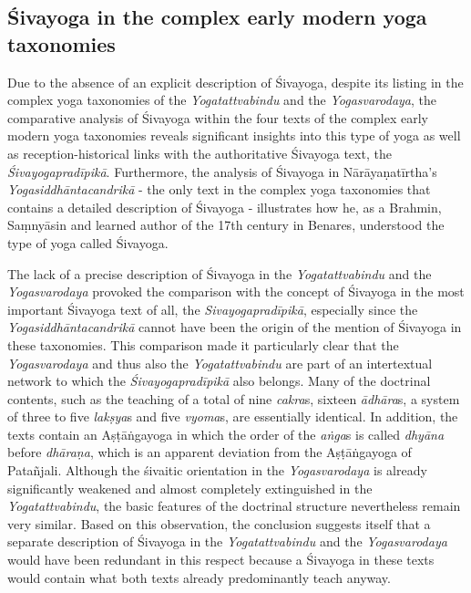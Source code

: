 \subsection{Śivayoga in the complex early modern yoga taxonomies}

Due to the absence of an explicit description of Śivayoga, despite its listing in the complex yoga taxonomies of the \emph{Yogatattvabindu} and the \emph{Yogasvarodaya}, the comparative analysis of Śivayoga within the four texts of the complex early modern yoga taxonomies reveals significant insights into this type of yoga as well as reception-historical links with the authoritative Śivayoga text, the \emph{Śivayogapradīpikā}. Furthermore, the analysis of Śivayoga in Nārāyaṇatīrtha's \emph{Yogasiddhāntacandrikā} - the only text in the complex yoga taxonomies that contains a detailed description of Śivayoga - illustrates how he, as a Brahmin, Saṃnyāsin and learned author of the 17th century in Benares, understood the type of yoga called Śivayoga.

The lack of a precise description of Śivayoga in the \emph{Yogatattvabindu} and the \emph{Yogasvarodaya} provoked the comparison with the concept of Śivayoga in the most important Śivayoga text of all, the \emph{Sivayogapradīpikā}, especially since the \emph{Yogasiddhāntacandrikā} cannot have been the origin of the mention of Śivayoga in these taxonomies. This comparison made it particularly clear that the \emph{Yogasvarodaya} and thus also the \emph{Yogatattvabindu} are part of an intertextual network to which the \emph{Śivayogapradīpikā} also belongs. Many of the doctrinal contents, such as the teaching of a total of nine \emph{cakra}s, sixteen \emph{ādhāra}s, a system of three to five \textit{lakṣya}s and five \emph{vyoma}s, are essentially identical. In addition, the texts contain an Aṣṭāṅgayoga in which the order of the \textit{aṅga}s is called \textit{dhyāna} before \textit{dhāraṇa}, which is an apparent deviation from the Aṣṭāṅgayoga of Patañjali. Although the śivaitic orientation in the \emph{Yogasvarodaya} is already significantly weakened and almost completely extinguished in the \emph{Yogatattvabindu}, the basic features of the doctrinal structure nevertheless remain very similar. Based on this observation, the conclusion suggests itself that a separate description of Śivayoga in the \emph{Yogatattvabindu} and the \emph{Yogasvarodaya} would have been redundant in this respect because a Śivayoga in these texts would contain what both texts already predominantly teach anyway.


